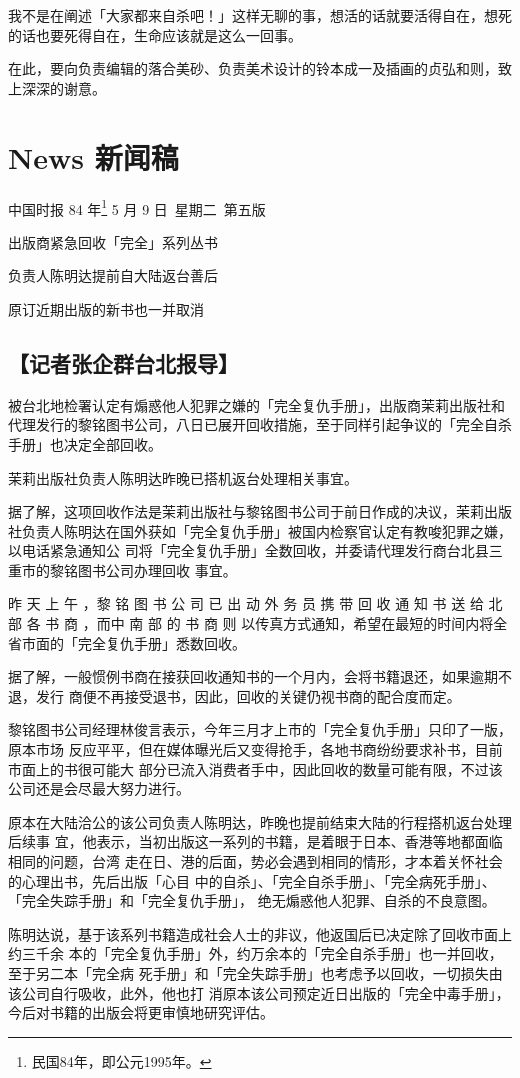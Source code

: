 \documentclass[UTF8]{ctexart}
\begin{document}
我不是在阐述「大家都来自杀吧！」这样无聊的事，想活的话就要活得自在，想死的话也要死得自在，生命应该就是这么一回事。

\newpage

在此，要向负责编辑的落合美砂、负责美术设计的铃本成一及插画的贞弘和则，致上深深的谢意。


\newpage

\section{News 新闻稿}

中国时报 84 年\footnote{民国84年，即公元1995年。} 5 月 9 日\ 星期二\ 第五版

出版商紧急回收「完全」系列丛书

负责人陈明达提前自大陆返台善后

原订近期出版的新书也一并取消

\subsection*{【记者张企群台北报导】}

被台北地检署认定有煽惑他人犯罪之嫌的「完全复仇手册」，出版商茉莉出版社和代理发行的黎铭图书公司，八日已展开回收措施，至于同样引起争议的「完全自杀手册」也决定全部回收。

茉莉出版社负责人陈明达昨晚已搭机返台处理相关事宜。

据了解，这项回收作法是茉莉出版社与黎铭图书公司于前日作成的决议，茉莉出版社负责人陈明达在国外获如「完全复仇手册」被国内检察官认定有教唆犯罪之嫌，以电话紧急通知公 司将「完全复仇手册」全数回收，并委请代理发行商台北县三重市的黎铭图书公司办理回收 事宜。

昨 天 上 午 ，黎 铭 图 书 公 司 已 出 动 外 务 员 携 带 回 收 通 知 书 送 给 北 部 各 书 商 ，而中 南 部 的 书 商 则 以传真方式通知，希望在最短的时间内将全省市面的「完全复仇手册」悉数回收。

据了解，一般惯例书商在接获回收通知书的一个月内，会将书籍退还，如果逾期不退，发行
商便不再接受退书，因此，回收的关键仍视书商的配合度而定。

黎铭图书公司经理林俊言表示，今年三月才上市的「完全复仇手册」只印了一版，原本市场
反应平平，但在媒体曝光后又变得抢手，各地书商纷纷要求补书，目前市面上的书很可能大
部分已流入消费者手中，因此回收的数量可能有限，不过该公司还是会尽最大努力进行。

原本在大陆洽公的该公司负责人陈明达，昨晚也提前结束大陆的行程搭机返台处理后续事 宜，他表示，当初出版这一系列的书籍，是着眼于日本、香港等地都面临相同的问题，台湾 走在日、港的后面，势必会遇到相同的情形，才本着关怀社会的心理出书，先后出版「心目 中的自杀」、「完全自杀手册」、「完全病死手册」、「完全失踪手册」和「完全复仇手册」， 绝无煽惑他人犯罪、自杀的不良意图。

陈明达说，基于该系列书籍造成社会人士的非议，他返国后已决定除了回收市面上约三千余 本的「完全复仇手册」外，约万余本的「完全自杀手册」也一并回收，至于另二本「完全病 死手册」和「完全失踪手册」也考虑予以回收，一切损失由该公司自行吸收，此外，他也打 消原本该公司预定近日出版的「完全中毒手册」，今后对书籍的出版会将更审慎地研究评估。
\end{document}
